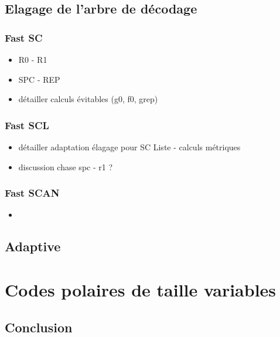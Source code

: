 \subsection{Elagage de l'arbre de décodage}

\subsubsection{Fast SC}
\begin{itemize}
\item R0 - R1
\item SPC - REP
\item détailler calculs évitables (g0, f0, grep)
\end{itemize}
\subsubsection{Fast SCL}
\begin{itemize}
\item détailler adaptation élagage pour SC Liste - calculs métriques
\item discussion chase spc - r1 ?

\end{itemize}
\subsubsection{Fast SCAN}
\begin{itemize}
\item 
\end{itemize}

\subsection{Adaptive}

\section{Codes polaires de taille variables}


\subsection*{Conclusion}
